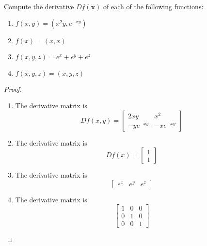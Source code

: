 \documentclass[openany]{book}
\begin{document}
\begin{prob}[3]
    Compute the derivative \( Df(\mathbf{x}) \) of each of the following functions:

    \begin{enumerate}
        \item[(a)] \( f(x, y) = (x^2y, e^{-xy}) \)
        \item[(b)] \( f(x) = (x, x) \)
        \item[(c)] \( f(x, y, z) = e^x + e^y + e^z \)
        \item[(d)] \( f(x, y, z) = (x, y, z) \)
    \end{enumerate}
\end{prob}
\begin{proof}
    \begin{enumerate}
        \item[(a)] The derivative matrix is 
        \begin{equation*}
            Df(x,y)=\begin{bmatrix}
                2xy&x^2\\
                -ye^{-xy}&-xe^{-xy}
            \end{bmatrix}
        \end{equation*}
        \item[(b)] The derivative matrix is 
        \begin{equation*}
            Df(x)=\begin{bmatrix}
                1\\
                1
            \end{bmatrix}
        \end{equation*}
        \item[(c)] The derivative matrix is 
        \begin{equation*}
            \begin{bmatrix}
                e^x&e^y&e^z
            \end{bmatrix}
        \end{equation*}
        \item[(d)] The derivative matrix is
        \begin{equation*}
            \begin{bmatrix}
                1&0&0\\
                0&1&0\\
                0&0&1
            \end{bmatrix}
        \end{equation*}
    \end{enumerate}
\end{proof}
\end{document}
